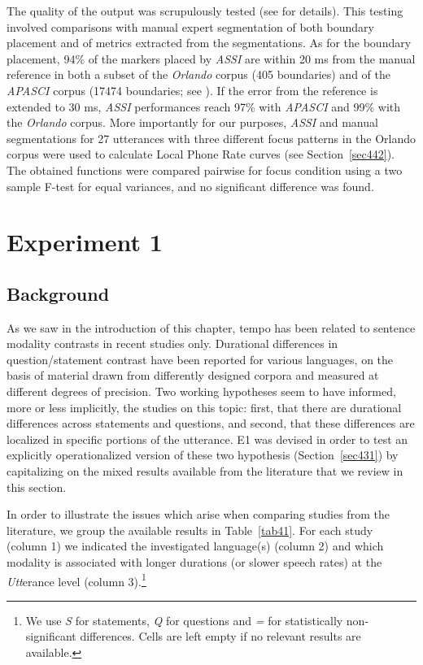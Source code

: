 The quality of the output was scrupulously tested (see \citealt{cangemi2011automatic} for details). This testing involved comparisons with manual expert segmentation of both boundary placement and of metrics extracted from the segmentations. As for the boundary placement, 94\% of the markers placed by \textit{ASSI} are within 20 ms from the manual reference in both a subset of the \textit{Orlando} corpus (405 boundaries) and  of the \textit{APASCI} corpus (17474 boundaries; see \citealt{angelini1993baseline}). If the error from the reference is extended to 30 ms, \textit{ASSI} performances reach 97\% with \textit{APASCI} and 99\% with the \textit{Orlando} corpus. More importantly for our purposes, \textit{ASSI} and manual segmentations for 27 utterances with three different focus patterns in the Orlando corpus were used to calculate Local Phone Rate curves (see Section~\ref{sec442}). The obtained functions were compared pairwise for focus condition using a two sample F-test for equal variances, and no significant difference was found.

\section{Experiment 1}\label{sec43}
\subsection{Background}\label{sec430}
As we saw in the introduction of this chapter, tempo has been related to sentence modality contrasts in recent studies only. Durational differences in question/statement contrast have been reported for various languages, on the basis of material drawn from differently designed corpora and measured at different degrees of precision. Two working hypotheses seem to have informed, more or less implicitly, the studies on this topic: first, that there are durational differences across statements and questions, and second, that these differences are localized in specific portions of the utterance. E1 was devised in order to test an explicitly operationalized version of these two hypothesis (Section~\ref{sec431}) by capitalizing on the mixed results available from the literature that we review in this section.

In order to illustrate the issues which arise when comparing studies from the literature, we group the available results in Table~\ref{tab41}. For each study (column 1) we indicated the investigated language(s) (column 2) and which modality is associated with longer durations (or slower speech rates) at the \textit{Utt}erance level (column 3).\footnote{We use \textit{S} for statements, \textit{Q} for questions and \textit{=} for statistically non-significant differences. Cells are left empty if no relevant results are available.} 

